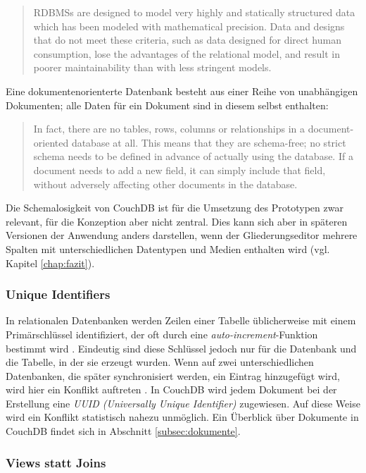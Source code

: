 \begin{quote}
RDBMSs are designed to model very highly and statically structured data which has been modeled with mathematical precision. Data and designs that do not meet these criteria, such as data designed for direct human consumption, lose the advantages of the relational model, and result in poorer maintainability than with less stringent models. 
\end{quote}

Eine dokumentenorienterte Datenbank besteht aus einer Reihe von unabhängigen Dokumenten; alle Daten für ein Dokument sind in diesem selbst enthalten:

\begin{quote}
In fact, there are no tables, rows, columns or relationships in a document-oriented database at all. This means that they are schema-free; no strict schema needs to be defined in advance of actually using the database. If a document needs to add a new field, it can simply include that field, without adversely affecting other documents in the database. \cite{couchdb:ibm} 
\end{quote}

Die Schemalosigkeit von CouchDB ist für die Umsetzung des Prototypen zwar relevant, für die Konzeption aber nicht zentral. Dies kann sich aber in späteren Versionen der Anwendung anders darstellen, wenn der Gliederungseditor mehrere Spalten mit unterschiedlichen Datentypen und Medien enthalten wird (vgl. Kapitel \ref{chap:fazit}). 


\subsubsection{Unique Identifiers}

In relationalen Datenbanken werden Zeilen einer Tabelle üblicherweise mit einem Primärschlüssel identifiziert, der oft durch eine \textit{auto-increment}-Funktion bestimmt wird \cite{couchdb:ibm}. Eindeutig sind diese Schlüssel jedoch nur für die Datenbank und die Tabelle, in der sie erzeugt wurden. Wenn auf zwei unterschiedlichen Datenbanken, die später synchronisiert werden, ein Eintrag hinzugefügt wird, wird hier ein Konflikt auftreten \cite{mysql:increment}. In CouchDB wird jedem Dokument bei der Erstellung eine \textit{UUID (Universally Unique Identifier)} zugewiesen. Auf diese Weise wird ein Konflikt statistisch nahezu unmöglich. Ein Überblick über Dokumente in CouchDB findet sich in Abschnitt \ref{subsec:dokumente}.

\subsubsection{Views statt Joins}

